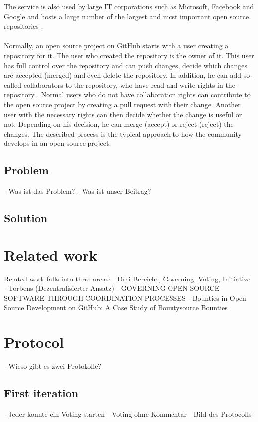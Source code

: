 \documentclass[sigconf]{acmart}
\begin{document}
\cite{git2021hub} The service is also used by large IT corporations such as Microsoft, Facebook and Google and hosts a large 
number of the largest and most important open source repositories \cite{git2021stars}.\\ \\
Normally, an open source project on GitHub starts with a user creating a repository for it. The user who created the 
repository is the owner of it. This user has full control over the repository and can push changes, decide which changes are 
accepted (merged) and even delete the repository. In addition, he can add so-called collaborators to the repository, who have 
read and write rights in the repository \cite{git2021rights}. Normal users who do not have collaboration rights can contribute to 
the open source project by creating a pull request with their change. Another user with the necessary rights can then decide 
whether the change is useful or not. Depending on his decision, he can merge (accept) or reject (reject) the changes. 
The described process is the typical approach to how the community develops in an open source project.


\subsection{Problem}

- Was ist das Problem?
- Was ist unser Beitrag?

\subsection{Solution}

\section{Related work}
Related work falls into three areas:
- Drei Bereiche, Governing, Voting, Initiative
- Torbens (Dezentralisierter Ansatz)
- GOVERNING OPEN SOURCE SOFTWARE THROUGH COORDINATION PROCESSES 
- Bounties in Open Source Development on GitHub: A Case Study of Bountysource Bounties

\section{Protocol}
- Wieso gibt es zwei Protokolle?
\subsection{First iteration}
- Jeder konnte ein Voting starten
- Voting ohne Kommentar
- Bild des Protocolls
\end{document}
